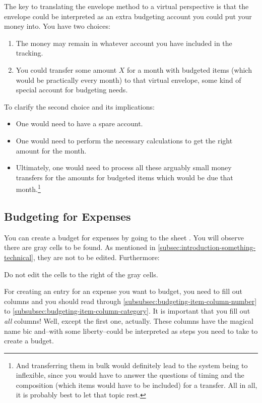 The key to translating the envelope method to a virtual perspective is that the envelope could be interpreted as an extra budgeting account you could put your money into.
You have two choices:
\begin{enumerate}
	\item The money may remain in whatever account you have included in the tracking.
	\item You could transfer some amount \( X \) for a month with budgeted items (which would be practically every month) to that virtual envelope, \ie some kind of special account for budgeting needs.
\end{enumerate}

To clarify the second choice and its implications:
\begin{itemize}
	\item One would need to have a spare account.
	\item One would need to perform the necessary calculations to get the right amount for the month.
	\item Ultimately, one would need to process all these arguably small money transfers for the amounts for budgeted items which would be due that month.\footnote{And transferring them in bulk would definitely lead to the system being to inflexible, since you would have to answer the questions of timing and the composition (which items would have to be included) for a transfer.
	All in all, it is probably best to let that topic rest.}
\end{itemize}

\subsection{Budgeting for Expenses}
\label{subsec:budgeting-expenses}

You can create a budget for expenses by going to the sheet .
You will observe there are gray cells to be found.
As mentioned in \autoref{subsec:introduction-something-technical}, they are not to be edited.
Furthermore:
\begin{center}\sffamily
	Do not edit the cells to the right of the gray cells.
\end{center}

For creating an entry for an expense you want to budget, you need to fill out columns and you should read through \autoref{subsubsec:budgeting-item-column-number} to \autoref{subsubsec:budgeting-item-column-category}.
It is important that you fill out \emph{all} columns!
Well, except the first one, actually.
These columns have the magical name \ac{bic} and--with some liberty--could be interpreted as steps you need to take to create a budget.

